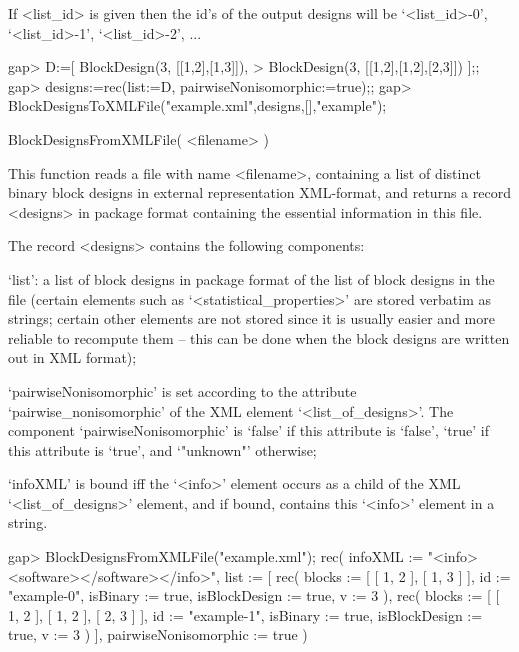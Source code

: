 If <list_id> is given then the id's of the output designs will be
`<list_id>-0', `<list_id>-1', `<list_id>-2', ...

\beginexample
gap> D:=[ BlockDesign(3, [[1,2],[1,3]]),                        
>         BlockDesign(3, [[1,2],[1,2],[2,3]]) ];;
gap> designs:=rec(list:=D, pairwiseNonisomorphic:=true);;
gap> BlockDesignsToXMLFile("example.xml",designs,[],"example"); 
\endexample


\>BlockDesignsFromXMLFile( <filename> )

This function reads a file with name <filename>, containing a list of
distinct binary block designs in external representation XML-format,
and returns a record  <designs> in {\DESIGN} package format containing
the essential information in this file.

The record <designs> contains the following components:

`list': a list of block designs in {\DESIGN} package format of
the list of block designs in the file (certain elements such as
`<statistical_properties>' are stored verbatim as strings; certain other
elements are not stored since it is usually easier and more reliable to
recompute them -- this can be done when the block designs are written
out in XML format);

`pairwiseNonisomorphic' is set according to the attribute
`pairwise_nonisomorphic' of the XML element `<list_of_designs>'.
The component `pairwiseNonisomorphic' is `false' if this attribute
is `false', `true' if this attribute is `true', and `"unknown"' otherwise;

`infoXML' is bound iff the `<info>' element occurs as a child of the
XML `<list_of_designs>' element, and if bound, contains this `<info>'
element in a string.

\beginexample
gap> BlockDesignsFromXMLFile("example.xml");
rec( 
  infoXML := "<info>\n<software>\n</software>\n</info>", 
  list := 
    [ 
      rec( blocks := [ [ 1, 2 ], [ 1, 3 ] ], id := "example-0", 
          isBinary := true, isBlockDesign := true, v := 3 ), 
      rec( blocks := [ [ 1, 2 ], [ 1, 2 ], [ 2, 3 ] ], id := "example-1", 
          isBinary := true, isBlockDesign := true, v := 3 ) ], 
  pairwiseNonisomorphic := true )
\endexample

